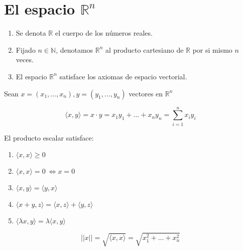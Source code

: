 \chapter{El espacio $\mathbb{R}^n$}

\begin{nota}
\begin{enumerate}[label=(\roman*)]
    \item Se denota $\mathbb{R}$ el cuerpo de los números reales. 
    \item Fijado $n \in \mathbb{N}$, denotamos $\mathbb{R}^n$ al producto cartesiano de $\mathbb{R}$ por si mismo $n$ veces. 
    \item El espacio $\mathbb{R}^n$ satisface los axiomas de espacio vectorial. 
\end{enumerate}
\end{nota}

Sean $ x = (x_1,...,x_n), y = (y_1,...,y_n)$ vectores en $\mathbb{R}^n$

\begin{defn}

\[\langle x{,}y\rangle =  x \cdot y = x_1 y_1 + ... + x_n y_n = \sum^{n}_{i=1} x_i y_i\]

\end{defn}

\begin{prop}{}

El producto escalar satisface:

\begin{enumerate}[label=(\roman*)]
    \item $\langle x{,}x\rangle \geq 0$
    \item $\langle x{,}x\rangle = 0 \ \Leftrightarrow x=0$
    \item $\langle x{,}y\rangle = \langle y{,}x\rangle$
    \item $\langle x + y{,}z\rangle = \langle x{,}z\rangle +\langle y{,}z\rangle$
    \item $\langle \lambda x{,}y\rangle = \lambda\langle x{,}y\rangle$
\end{enumerate}

\end{prop}

\begin{defn}{}

\[ ||x|| = \sqrt{\langle x{,}x\rangle} = \sqrt{x_1^2 + ... + x_n^2} \]

\end{defn}

